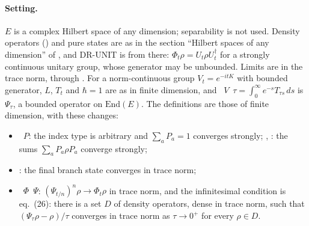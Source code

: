 \documentclass[11pt]{article}
\begin{document}
\paragraph{Setting.} $E$ is a complex Hilbert space of any dimension; separability is not used.
Density operators () and pure states are as in
the section ``Hilbert spaces of any dimension'' of
, and DR-UNIT is  from there:
$\Phi_t\rho = U_t\rho U_t^\dagger$ for a strongly continuous unitary group, whose generator may be
unbounded. Limits are in the trace norm, through . For a norm-continuous group
$V_t = e^{-itK}$ with bounded generator, $L$, $T_t$ and $\hbar = 1$ are as in finite dimension, and
~$V$~$\tau = \int_0^\infty e^{-s}T_{\tau s}\,ds$ is $\Psi_\tau$, a bounded
operator on $\mathrm{End}(E)$. The definitions are those of finite dimension, with these changes:
\begin{itemize}
\item {}~$P$: the index type is arbitrary and $\sum_a P_a = 1$
  converges strongly; , : the sums
  $\sum_a P_a\rho P_a$ converge strongly;
\item {}: the final branch state converges in trace norm;
\item {}~$\Phi$~$\Psi$: $(\Psi_{t/n})^n\rho \to \Phi_t\rho$ in trace norm,
  and the infinitesimal condition is eq.~(26): there is a set $D$ of density operators, dense in
  trace norm, such that $(\Psi_\tau\rho - \rho)/\tau$ converges in trace norm as $\tau \to 0^+$ for
  every $\rho \in D$.
\end{itemize}
\end{document}
